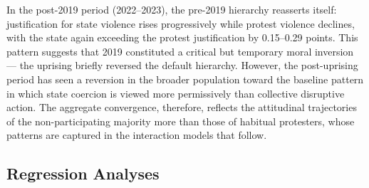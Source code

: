 \documentclass[
  13pt,
]{article}
\begin{document}
In the post-2019 period (2022--2023), the pre-2019 hierarchy reasserts
itself: justification for state violence rises progressively while
protest violence declines, with the state again exceeding the protest
justification by 0.15--0.29 points. This pattern suggests that 2019
constituted a critical but temporary moral inversion --- the uprising
briefly reversed the default hierarchy. However, the post-uprising
period has seen a reversion in the broader population toward the
baseline pattern in which state coercion is viewed more permissively
than collective disruptive action. The aggregate convergence, therefore,
reflects the attitudinal trajectories of the non-participating majority
more than those of habitual protesters, whose patterns are captured in
the interaction models that follow.

\subsection{Regression Analyses}\label{regression-analyses}
\end{document}
